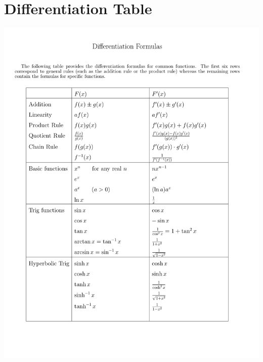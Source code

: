 \clearpage
\section{Differentiation Table}

\begin{center}
\includegraphics[page=1,width=14cm,trim=1.75cm 3.0cm 2.5cm 5.0cm,clip]{./files/calcrulz.pdf}
\end{center}
\hfill
